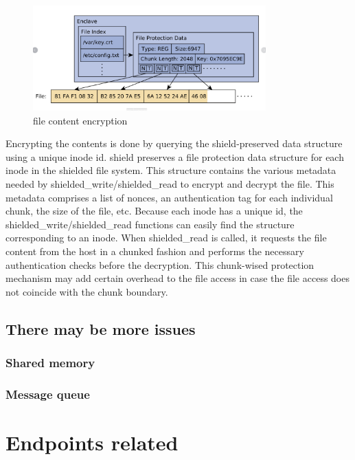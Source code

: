 \begin{figure}[H]
    \centering
    \includegraphics[width=0.8\textwidth]{images/fileencption.png}
    \caption[file content encryption]{file content encryption}
    \label{fig:file_content_encryption}
\end{figure}
Encrypting the contents is done by querying the shield-preserved data structure using a unique inode id. shield preserves a file protection data structure for each inode in the shielded file system. This structure contains the various metadata needed by shielded\_write/shielded\_read to encrypt and 
decrypt the file. This metadata comprises a list of nonces, an authentication tag for each individual chunk, the size of the file, etc. Because each inode has a unique id, the shielded\_write/shielded\_read functions can easily find the structure corresponding to an inode.
When shielded\_read is called, it requests the file content from the host in a chunked fashion and performs the necessary authentication checks before the decryption. This chunk-wised protection mechanism may add certain overhead to the file access in case the file access does not 
coincide with the chunk boundary.




\subsection{There may be more issues}
\subsubsection{Shared memory}
\subsubsection{Message queue}

\section{Endpoints related}
